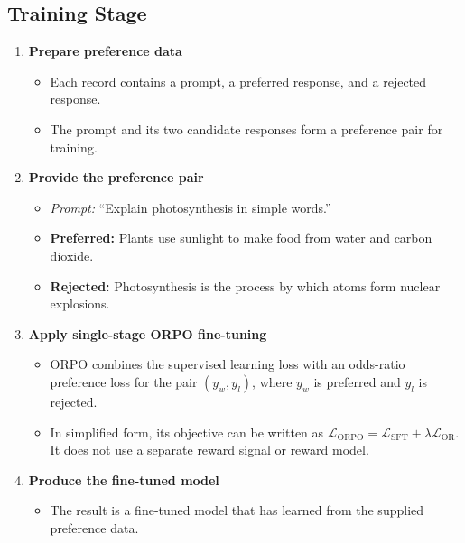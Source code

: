 \documentclass{article}
\newcommand{\cmark}{\ding{51}}%
\newcommand{\xmark}{\ding{55}}%
\begin{document}
\subsection{Training Stage}

\begin{enumerate}
    \item \textbf{Prepare preference data}
    \begin{itemize}
        \item Each record contains a prompt, a preferred response, and a rejected response.
        \item The prompt and its two candidate responses form a preference pair for training.
    \end{itemize}
    
    \item \textbf{Provide the preference pair}
    \begin{itemize}
        \item \textit{Prompt:} ``Explain photosynthesis in simple words.''
        \item[\cmark] \textbf{Preferred:} Plants use sunlight to make food from water and carbon dioxide.
        \item[\xmark] \textbf{Rejected:} Photosynthesis is the process by which atoms form nuclear explosions.
    \end{itemize}
    
    \item \textbf{Apply single-stage ORPO fine-tuning}
    \begin{itemize}
        \item ORPO combines the supervised learning loss with an odds-ratio preference loss for the pair $(y_w, y_l)$, where $y_w$ is preferred and $y_l$ is rejected.
        \item In simplified form, its objective can be written as $\mathcal{L}_{\mathrm{ORPO}} = \mathcal{L}_{\mathrm{SFT}} + \lambda\mathcal{L}_{\mathrm{OR}}$. It does not use a separate reward signal or reward model.
    \end{itemize}
    
    \item \textbf{Produce the fine-tuned model}
    \begin{itemize}
        \item The result is a fine-tuned model that has learned from the supplied preference data.
    \end{itemize}
\end{enumerate}
\end{document}
